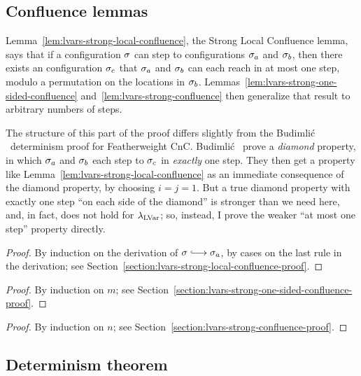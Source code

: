 \subsection{Confluence lemmas}\label{subsection:lvars-confluence}

Lemma~\ref{lem:lvars-strong-local-confluence}, the Strong Local
Confluence lemma, says that if a configuration $\sigma$ can step to
configurations $\sigma_a$ and $\sigma_b$, then there exists an
configuration $\sigma_c$ that $\sigma_a$ and $\sigma_b$ can each reach in
at most one step, modulo a permutation on the locations in $\sigma_b$.
Lemmas~\ref{lem:lvars-strong-one-sided-confluence}
and~\ref{lem:lvars-strong-confluence} then generalize that result to
arbitrary numbers of steps.

The structure of this part of the proof differs slightly from the
Budimli\'c \etal~determinism proof for Featherweight CnC.  Budimli\'c
\etal~prove a \emph{diamond} property, in which $\sigma_a$ and
$\sigma_b$ each step to $\sigma_c$ in \emph{exactly} one step.  They
then get a property like Lemma~\ref{lem:lvars-strong-local-confluence}
as an immediate consequence of the diamond property, by choosing $i =
j = 1$.  But a true diamond property with exactly one step ``on each
side of the diamond'' is stronger than we need here, and, in fact,
does not hold for $\lambda_{\textrm{LVar}}$; so, instead, I prove the weaker ``at
most one step'' property directly.

\LVarsLemStrongLocalConfluence
\begin{proof}
  By induction on the derivation of $\conf \parstepsto \conf_a$, by
  cases on the last rule in the derivation; see
  Section~\ref{section:lvars-strong-local-confluence-proof}. 
\end{proof}

\LVarsLemStrongOneSidedConfluence
\begin{proof}
  By induction on $m$; see
  Section~\ref{section:lvars-strong-one-sided-confluence-proof}.
\end{proof}

\LVarsLemStrongConfluence
\begin{proof}
  By induction on $n$; see
  Section~\ref{section:lvars-strong-confluence-proof}.
\end{proof}

\LVarsLemConfluence

\subsection{Determinism theorem}

